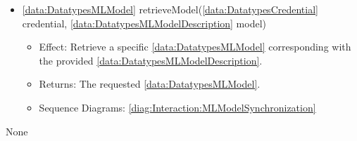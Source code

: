 \begin{description}
\begin{itemize}[noitemsep,nolistsep,leftmargin=-.25cm]
        \begin{itemize}[noitemsep,nolistsep]
           \item Effect: Send a list of MLModelUpdates to the online service. 
           \item Sequence Diagrams: None
        \end{itemize}
      \item \textsf{\ref{data:DatatypesMLModel} retrieveModel(\ref{data:DatatypesCredential} credential, \ref{data:DatatypesMLModelDescription} model)}
        \begin{itemize}[noitemsep,nolistsep]
           \item Effect: Retrieve a specific \ref{data:DatatypesMLModel} corresponding with the provided \ref{data:DatatypesMLModelDescription}. 
           \item Returns: The requested \ref{data:DatatypesMLModel}.
           \item Sequence Diagrams: \cref{diag:Interaction:MLModelSynchronization}
        \end{itemize}
    \end{itemize}
      \item[Diagrams:] None
    \end{description}

